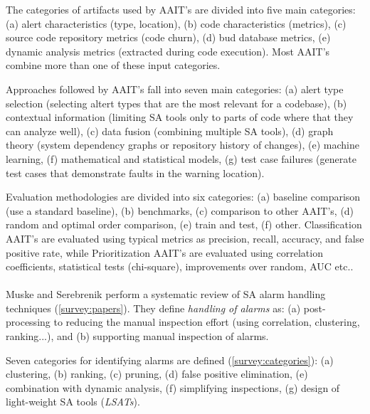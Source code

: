 \documentclass{article}
\begin{document}
 The categories of artifacts used by AAIT's are divided into five main categories: (a) alert characteristics (type, location), (b) code characteristics (metrics), (c) source code repository metrics (code churn), (d) bud database metrics, (e) dynamic analysis metrics (extracted during code execution). Most AAIT's combine more than one of these input categories.

 Approaches followed by AAIT's fall into seven main categories: (a) alert type selection (selecting altert types that are the most relevant for a codebase), (b) contextual information (limiting SA tools only to parts of code where that they can analyze well), (c) data fusion (combining multiple SA tools), (d) graph theory (system dependency graphs or repository history of changes), (e) machine learning, (f) mathematical and statistical models, (g) test case failures (generate test cases that demonstrate faults in the warning location). 

 Evaluation methodologies are divided into six categories: (a) baseline comparison (use a standard baseline), (b) benchmarks, (c) comparison to other AAIT's, (d) random and optimal order comparison, (e) train and test, (f) other.
 Classification AAIT's are evaluated using typical metrics as precision, recall, accuracy, and false positive rate, while Prioritization AAIT's are evaluated using correlation coefficients, statistical tests (chi-square), improvements over random, AUC etc..\\\\


 Muske and Serebrenik \cite{survey_approaches} perform a systematic review of SA alarm handling techniques (\cref{survey:papers}). They define \textit{handling of alarms}  as: (a) post-processing to reducing the manual inspection effort (using correlation, clustering, ranking...), and (b) supporting manual inspection of alarms.

 Seven categories for identifying alarms are defined (\cref{survey:categories}): (a) clustering, (b) ranking, (c) pruning, (d) false positive elimination, (e) combination with dynamic analysis, (f) simplifying inspections, (g) design of light-weight SA tools (\textit{LSATs}).
\end{document}
